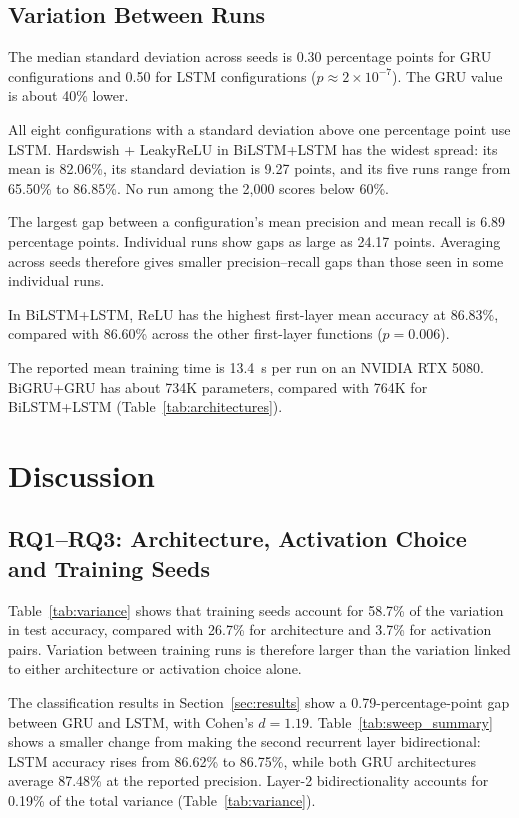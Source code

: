 \documentclass[conference,a4paper]{IEEEtran}
\begin{document}
\subsection{Variation Between Runs}

The median standard deviation across seeds is 0.30
percentage points for GRU configurations and 0.50 for
LSTM configurations ($p\approx2\times10^{-7}$).
The GRU value is about 40\% lower.

All eight configurations with a standard deviation above
one percentage point use LSTM. Hardswish + LeakyReLU in
BiLSTM+LSTM has the widest spread: its mean is 82.06\%,
its standard deviation is 9.27 points, and its five runs
range from 65.50\% to 86.85\%. No run among the 2{,}000
scores below 60\%.

The largest gap between a configuration's mean precision
and mean recall is 6.89 percentage points. Individual runs
show gaps as large as 24.17 points. Averaging across seeds
therefore gives smaller precision--recall gaps than those
seen in some individual runs.

In BiLSTM+LSTM, ReLU has the highest first-layer mean
accuracy at 86.83\%, compared with 86.60\% across the
other first-layer functions ($p=0.006$).

The reported mean training time is 13.4~s per run on an
NVIDIA RTX 5080. BiGRU+GRU has about 734K parameters,
compared with 764K for BiLSTM+LSTM
(Table~\ref{tab:architectures}).

\FloatBarrier
\section{Discussion}
\label{sec:discussion}

\subsection{RQ1--RQ3: Architecture, Activation Choice and Training Seeds}

Table~\ref{tab:variance} shows that training seeds account for
58.7\% of the variation in test accuracy, compared with 26.7\%
for architecture and 3.7\% for activation pairs. Variation
between training runs is therefore larger than the variation
linked to either architecture or activation choice alone.

The classification results in Section~\ref{sec:results} show
a 0.79-percentage-point gap between GRU and LSTM, with Cohen's
$d=1.19$. Table~\ref{tab:sweep_summary} shows a smaller change
from making the second recurrent layer bidirectional: LSTM
accuracy rises from 86.62\% to 86.75\%, while both GRU
architectures average 87.48\% at the reported precision.
Layer-2 bidirectionality accounts for 0.19\% of the total
variance (Table~\ref{tab:variance}).
\end{document}
